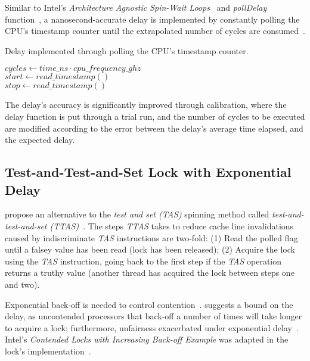 
Similar to Intel's
\emph{Architecture Agnostic Spin-Wait Loops}~\citep{intel2018spinloop} and
\emph{pollDelay} function~\citep[Example~2.3]{intelmanualoptimization}, a
nanosecond-accurate delay is implemented by constantly polling the CPU's timestamp
counter until the extrapolated number of cycles are
consumed~\cite{ramalhete2019delay}.

\begin{algorithm}
    \caption{Delay implemented through polling the CPU's timestamp counter.}\label{alg:delay}
            $cycles \gets time\_ns \cdot cpu\_frequency\_ghz$ \\
            $start \gets read\_timestamp()$ \\
            {
                $stop \gets read\_timestamp()$
            }
\end{algorithm}

The delay's accuracy is significantly improved through calibration, where the
delay function is put through a trial run, and the number of cycles to be
executed are modified according to the error between the delay's average time
elapsed, and the expected delay.

\subsection{Test-and-Test-and-Set Lock with Exponential Delay}
\citeauthor{rudolph1984dynamic} propose an alternative to the \emph{test and set
(TAS)} spinning method called \emph{test-and-test-and-set
(TTAS)}~\citep{rudolph1984dynamic}. The steps \emph{TTAS} takes to reduce cache line
invalidations caused by indiscriminate \emph{TAS} instructions are two-fold: (1) Read
the polled flag until a falsey value has been read (lock has been released);
(2) Acquire the lock using the \emph{TAS} instruction, going back to the
first step if the \emph{TAS} operation returns a truthy value (another thread
has acquired the lock between steps one and two). 

Exponential back-off is needed to control
contention~\citep{valois1994queues}. \citeauthor{anderson1990performance}
suggests a bound on the delay, as uncontended processors that back-off a number
of times will take longer to acquire a lock; furthermore, unfairness
exacerbated under exponential delay~\citep[Section~7.4]{herlihy2020art}.
Intel's \emph{Contended Locks with Increasing
Back-off Example} was adapted in the lock's implementation~\citep{intelmanualoptimization}.


